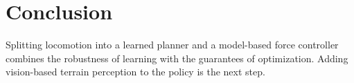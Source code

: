 \chapter{Conclusion}
\label{ch:conclusion}

Splitting locomotion into a learned planner and a model-based force controller combines the
robustness of learning with the guarantees of optimization. Adding vision-based terrain
perception to the policy is the next step.
